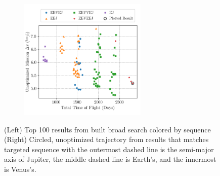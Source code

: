 \documentclass[letterpaper, preprint, paper,11pt]{AAS}	%
\begin{document}
\begin{figure}[!ht]
    \centering
    \begin{subfigure}
        \centering\includegraphics[width=2.4in]{./fig/clipperResults.png}
    \end{subfigure}
    \begin{subfigure}
        \centering
    \end{subfigure}
    \caption{(Left) Top 100 results from built broad search colored by sequence\hspace{1em} (Right) Circled, unoptimized trajectory from results that matches targeted sequence \cite{Buffington2014} with the outermost dashed line is the semi-major axis of Jupiter, the middle dashed line is Earth's, and the innermost is Venus's.}
    \label{fig:clipResults}
\end{figure}
\end{document}
